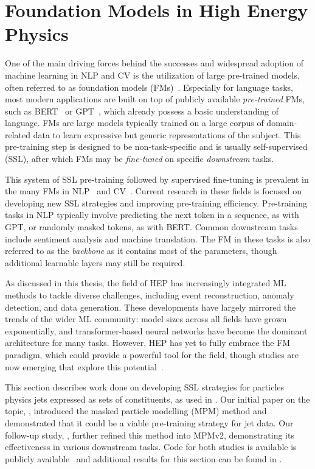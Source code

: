 \chapter{Foundation Models in High Energy Physics}
\label{ch:foundation_models}

One of the main driving forces behind the successes and widespread adoption of machine learning in NLP and CV is the utilization of large pre-trained models, often referred to as foundation models (FMs)~\cite{OpportunitiesRisksFoundation}.
Especially for language tasks, most modern applications are built on top of publicly available \textit{pre-trained} FMs, such as BERT~\cite{BERT} or GPT~\cite{GPT, GPT2}, which already possess a basic understanding of language.
FMs are large models typically trained on a large corpus of domain-related data to learn expressive but generic representations of the subject.
This pre-training step is designed to be non-task-specific and is usually self-supervised (SSL), after which FMs may be \textit{fine-tuned} on specific \textit{downstream} tasks.

This system of SSL pre-training followed by supervised fine-tuning is prevalent in the many FMs in NLP~\cite{BERT, GPT, GPT2, BART, LanguageModelsAre} and CV~\cite{DINO, Dalle, Flamingo, MAE, BEIT, IJepa}.
Current research in these fields is focused on developing new SSL strategies and improving pre-training efficiency.
Pre-training tasks in NLP typically involve predicting the next token in a sequence, as with GPT, or randomly masked tokens, as with BERT.
Common downstream tasks include sentiment analysis and machine translation. The FM in these tasks is also referred to as the \textit{backbone} as it contains most of the parameters, though additional learnable layers may still be required.

As discussed in this thesis, the field of HEP has increasingly integrated ML methods to tackle diverse challenges, including event reconstruction, anomaly detection, and data generation.
These developments have largely mirrored the trends of the wider ML community: model sizes across all fields have grown exponentially, and transformer-based neural networks have become the dominant architecture for many tasks.
However, HEP has yet to fully embrace the FM paradigm, which could provide a powerful tool for the field, though studies are now emerging that explore this potential~\cite{MPM, MPM2, ReSim, JapanPretrain, Omnijet, Omnilearn, LargeScalePretraining, JetCLR}.

This section describes work done on developing SSL strategies for particles physics jets expressed as sets of constituents, as used in .
Our initial paper on the topic, \textcite{MPM}, introduced the masked particle modelling (MPM) method and demonstrated that it could be a viable pre-training strategy for jet data.
Our follow-up study, \textcite{MPM2}, further refined this method into MPMv2, demonstrating its effectiveness in various downstream tasks.
Code for both studies is available is publicly available~\cite{MPMCode, MPM2Code} and additional results for this section can be found in .

